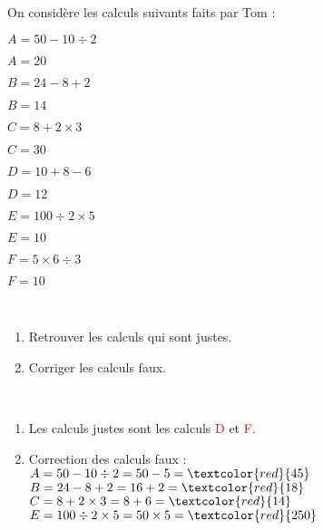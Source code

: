 \begin{exercice*} %
   On considère les calculs suivants faits par Tom :
   \setlength{\columnseprule}{0pt}
   \begin{multicols}{2}
      \begin{list}{}{}
         \item $A=50-10\div2$
         \item $A=20$
         
         \smallskip         
         \item $B=24-8+2$
         \item $B=14$

         \smallskip
         \item $C=8+2\times3$
         \item $C=30$
         \columnbreak
         \item $D=10+8-6$
         \item $D=12$
         
         \smallskip
         \item $E=100\div2\times5$
         \item $E=10$
         
         \smallskip
         \item $F=5\times6\div3$
         \item $F=10$
      \end{list}
   \end{multicols}
   \  \\ [-10mm]
   \begin{enumerate}
      \item Retrouver les calculs qui sont justes.
      \item Corriger les calculs faux.
   \end{enumerate}
\end{exercice*}

\begin{corrige}
   \ \\ [-5mm]
   \begin{enumerate}
      \item Les calculs justes sont les calculs \textcolor{red}{D} et \textcolor{red}{F}. \smallskip
      \item Correction des calculs faux : \\
         $A=50-10\div2 =50-5 =\textcolor{red}{45}$ \\ [1mm]
         $B=24-8+2 =16+2 =\textcolor{red}{18}$ \\ [1mm]
         $C=8+2\times3 =8+6 =\textcolor{red}{14}$ \\ [1mm]
         $E=100\div2\times5 =50\times5 = \textcolor{red}{250}$
   \end{enumerate}
\end{corrige}